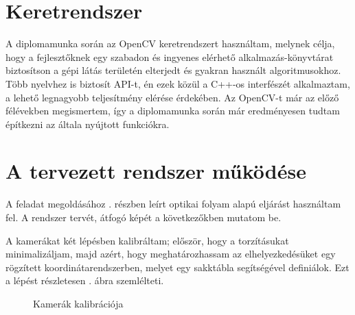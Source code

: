 \section{Keretrendszer}

A diplomamunka során az OpenCV \cite{opencv} keretrendszert használtam, melynek célja, hogy a fejlesztőknek egy szabadon és ingyenes elérhető alkalmazás-könyvtárat biztosítson a gépi látás területén elterjedt és gyakran használt algoritmusokhoz. Több nyelvhez is biztosít API-t, én ezek közül a C++-os interfészét alkalmaztam, a lehető legnagyobb teljesítmény elérése érdekében. Az OpenCV-t már az előző félévekben megismertem, így a diplomamunka során már eredményesen tudtam építkezni az általa nyújtott funkciókra.

\section{A tervezett rendszer működése}

A feladat megoldásához . részben leírt optikai folyam alapú eljárást használtam fel. A rendszer tervét, átfogó képét a következőkben mutatom be.

A kamerákat két lépésben kalibráltam; először, hogy a torzításukat minimalizáljam, majd azért, hogy meghatározhassam az elhelyezkedésüket egy rögzített koordinátarendszerben, melyet egy sakktábla segítségével definiálok. Ezt a lépést részletesen . ábra szemlélteti.

\begin{figure}[tbh]
\centering


\caption{Kamerák kalibrációja \label{fig:plan-calibration}}
\end{figure}

